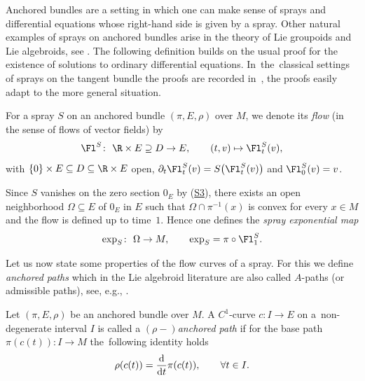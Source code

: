 Anchored bundles are a setting in which one can make sense of sprays and differential equations whose right-hand side is given by a spray.
Other natural examples of sprays on anchored bundles arise in the theory of Lie groupoids and Lie algebroids, see \cite{CaMaS20,CaF03}.
The following definition builds on the usual proof for the existence of solutions to ordinary differential equations. In~the~classical settings of sprays on the tangent bundle the proofs are recorded in~\mbox{\cite[Chapter~IV, Section~4]{La01}}, the proofs easily adapt to the more general situation.

\begin{Definition}
For a spray $S$ on an anchored bundle $(\pi,E,\rho)$ over $M$, we denote its \emph{flow} (in the sense of flows of vector fields) by{\samepage
\begin{displaymath}
 \Fl^S \colon\ \R \times E \supseteq D \rightarrow E,\qquad (t,v) \mapsto \Fl_t^S (v),\end{displaymath} with $\{0\}\times E \subseteq D\subseteq \R \times E$ open, $\partial_t \Fl_{t}^{S}(v) = S\bigl(\Fl_{t}^{S}(v)\bigr)$ and $\Fl_0^S(v)=v$.}

Since $S$ vanishes on the zero section $0_E$ by (\hyperlink{sprayS3}{S3}), there exists an open neighborhood $\Omega \subseteq E$ of $0_E$ in $E$ such that $\Omega \cap \pi^{-1}(x)$ is convex for every $x \in M$ and the flow is defined up to time~$1$. Hence one defines the \emph{spray exponential map}
\begin{displaymath}\exp_S \colon\ \Omega \rightarrow M,\qquad \exp_S = \pi \circ \Fl^S_1.\end{displaymath}
\end{Definition}

Let us now state some properties of the flow curves of a spray. For this we define \emph{anchored paths} which in the Lie algebroid literature are also called $A$-paths (or admissible paths), see, e.g., \cite[\S1.1]{CaF03}.

\begin{Definition}
Let $(\pi,E,\rho)$ be an anchored bundle over $M$. A $C^1$-curve $c \colon I \rightarrow E$ on a~non-degenerate interval $I$ is called a $(\rho-)$\emph{anchored path} if for the base path $\pi (c(t))\colon I \rightarrow M$ the~following identity holds
\begin{displaymath}\rho(c(t))=\frac{{\rm d}}{{\rm d}t} \pi (c(t)), \qquad \forall t \in I.
\end{displaymath}
\end{Definition}


